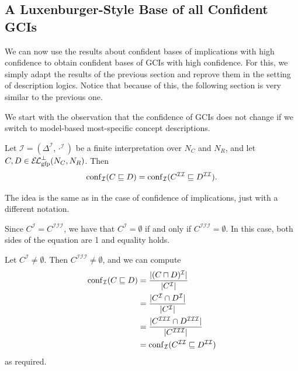 \subsection{A Luxenburger-Style Base of all Confident GCIs}
\label{sec:first-base}

We can now use the results about confident bases of implications with high confidence to
obtain confident bases of GCIs with high confidence.  For this, we simply adapt the
results of the previous section and reprove them in the setting of description logics.
Notice that because of this, the following section is very similar to the previous one.

We start with the observation that the confidence of GCIs does not change if we switch to
model-based most-specific concept descriptions.

\begin{Lemma}
  \label{lem:confidence-stays-under-mmsc}
  Let $\mathcal{I} = (\Delta^{\mathcal{I}}, \cdot^{\mathcal{I}})$ be a finite
  interpretation over $N_C$ and $N_R$, and let $C, D \in {\ensuremath{{\mathcal{E}\kern-.3ex\mathcal{L}}_\text{gfp}^\bot}}(N_C, N_R)$.  Then
  \begin{equation*}
    \operatorname{conf}_{\mathcal{I}}( C \sqsubseteq D ) = \operatorname{conf}_{\mathcal{I}}(
    C^{\mathcal{I}\mathcal{I}} \sqsubseteq D^{\mathcal{I}\mathcal{I}}).
  \end{equation*}
\end{Lemma}
\begin{Proof}
  The idea is the same as in the case of confidence of implications, just with a different
  notation.

  Since $C^{\mathcal{I}} = C^{\mathcal{I}\mathcal{I}\mathcal{I}}$, we have that
  $C^{\mathcal{I}} = \emptyset$ if and only if $C^{\mathcal{I}\mathcal{I}\mathcal{I}} =
  \emptyset$.  In this case, both sides of the equation are 1 and equality holds.

  Let $C^{\mathcal{I}} \neq \emptyset$.  Then $C^{\mathcal{I}\mathcal{I}\mathcal{I}} \neq
  \emptyset$, and we can compute
  \begin{align*}
    \operatorname{conf}_{\mathcal{I}}( C \sqsubseteq D )
    &= \frac{ \lvert (C \sqcap D)^{\mathcal{I}} \rvert }{ \lvert C^{\mathcal{I}} \rvert } \\
    &= \frac{ \lvert C^{\mathcal{I}} \cap D^{\mathcal{I}} \rvert }{ \lvert C^{\mathcal{I}} \rvert }
    \\
    &= \frac{ \lvert C^{\mathcal{I}\mathcal{I}\mathcal{I}} \cap
        D^{\mathcal{I}\mathcal{I}\mathcal{I}} \rvert }{ \lvert
        C^{\mathcal{I}\mathcal{I}\mathcal{I}} \rvert } \\
    &= \operatorname{conf}_{\mathcal{I}}( C^{\mathcal{I}\mathcal{I}} \sqsubseteq
    D^{\mathcal{I}\mathcal{I}} )
  \end{align*}
  as required.
\end{Proof}

